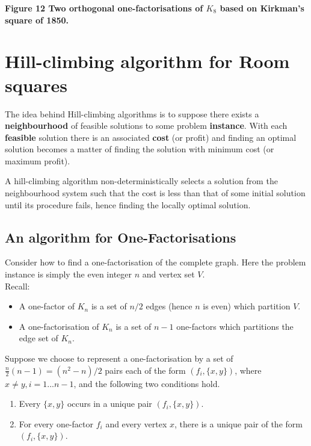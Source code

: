 \documentclass[
  12pt,
  a4paper]{book}
\begin{document}
\textbf{Figure 12 Two orthogonal one-factorisations of \(K_8\) based on
Kirkman's square of 1850.}

\hypertarget{hill-climbing-algorithm-for-room-squares}{%
\section{Hill-climbing algorithm for Room squares}\label{hill-climbing-algorithm-for-room-squares}}

The idea behind Hill-climbing algorithms is to suppose there exists a
\textbf{neighbourhood} of feasible solutions to some problem \textbf{instance}. With
each \textbf{feasible} solution there is an associated \textbf{cost} (or profit) and
finding an optimal solution becomes a matter of finding the solution with
minimum cost (or maximum profit).

A hill-climbing algorithm non-deterministically selects a solution from
the neighbourhood system such that the cost is less than that of some
initial solution until its procedure fails, hence finding the locally
optimal solution.

\hypertarget{an-algorithm-for-one-factorisations}{%
\subsection{An algorithm for One-Factorisations}\label{an-algorithm-for-one-factorisations}}

Consider how to find a one-factorisation of the complete graph. Here the
problem instance is simply the even integer \(n\) and vertex set \(V\).\\
Recall:

\begin{itemize}
\item
  A one-factor of \(K_n\) is a set of \(n/2\) edges (hence \(n\) is even)
  which partition \(V\).
\item
  A one-factorisation of \(K_n\) is a set of \(n-1\) one-factors which
  partitions the edge set of \(K_n\).
\end{itemize}

Suppose we choose to represent a one-factorisation by a set of
\(\frac{n}{2}(n-1)=(n^2-n)/2\) pairs each of the form \((f_i,\{x,y\})\),
where \(x \neq y, i=1...n-1\), and the following two conditions hold.

\begin{enumerate}
\def\labelenumi{\arabic{enumi}.}
\item
  Every \(\{x,y\}\) occurs in a unique pair \((f_i,\{x,y\})\).
\item
  For every one-factor \(f_i\) and every vertex \(x\), there is a unique
  pair of the form \((f_i,\{x,y\})\).
\end{enumerate}
\end{document}
